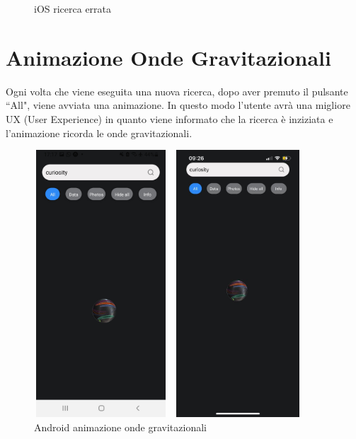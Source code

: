 \begin{figure}[h]
\begin{minipage}[h]{0.47\textwidth}
        \caption{\label{ricercaErrataIphone} iOS ricerca errata}
    \end{minipage}
\end{figure}

\section*{Animazione Onde Gravitazionali}
Ogni volta che viene eseguita una nuova ricerca, dopo aver premuto il pulsante ``All", viene avviata una animazione. In questo modo l'utente avr\`a una migliore UX (User Experience) in quanto viene informato che la ricerca \`e inziziata e l'animazione ricorda le onde gravitazionali.
\begin{figure}[H]
    \begin{minipage}[h]{0.47\textwidth}
        \centering
        \includegraphics[width=5cm, height=10cm]{images/immaginiAndroid/animazione.jpg}
        \caption{\label{animazioneAndroid} Android animazione onde gravitazionali}
    \end{minipage}
    \hfill
    \begin{minipage}[h]{0.47\textwidth}
        \centering
        \includegraphics[width=5cm, height=10cm]{images/immaginiPhone/animazione.jpeg}

\end{minipage}
\end{figure}
